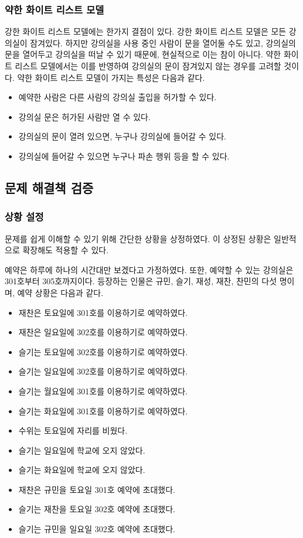\documentclass[11pt,a4paper]{article}
\begin{document}
\subsubsection{약한 화이트 리스트 모델}
강한 화이트 리스트 모델에는 한가지 결점이 있다. 강한 화이트 리스트 모델은 모든
강의실이 잠겨있다. 하지만 강의실을 사용 중인 사람이 문을 열어둘 수도 있고,
강의실의 문을 열어두고 강의실을 떠날 수 있기 때문에, 현실적으로 이는 참이
아니다. 약한 화이트 리스트 모델에서는 이를 반영하여 강의실의 문이 잠겨있지 않는
경우를 고려할 것이다. 약한 화이트 리스트 모델이 가지는 특성은 다음과 같다.
\begin{itemize}
\item 예약한 사람은 다른 사람의 강의실 출입을 허가할 수 있다.
\item 강의실 문은 허가된 사람만 열 수 있다.
\item 강의실의 문이 열려 있으면, 누구나 강의실에 들어갈 수 있다.
\item 강의실에 들어갈 수 있으면 누구나 파손 행위 등을 할 수 있다.
\end{itemize}

\subsection{문제 해결책 검증}

\subsubsection{상황 설정}
문제를 쉽게 이해할 수 있기 위해 간단한 상황을 상정하였다. 이 상정된 상황은
일반적으로 확장해도 적용할 수 있다.

예약은 하루에 하나의 시간대만 보겠다고 가정하였다. 또한, 예약할 수 있는
강의실은 301호부터 305호까지이다. 등장하는 인물은 규민, 슬기, 재성, 재찬,
찬민의 다섯 명이며, 예약 상황은 다음과 같다.

\begin{itemize}
\item 재찬은 토요일에 301호를 이용하기로 예약하였다.
\item 재찬은 일요일에 302호를 이용하기로 예약하였다.
\item 슬기는 토요일에 302호를 이용하기로 예약하였다.
\item 슬기는 일요일에 302호를 이용하기로 예약하였다.
\item 슬기는 월요일에 301호를 이용하기로 예약하였다.
\item 슬기는 화요일에 301호를 이용하기로 예약하였다.
\item 수위는 토요일에 자리를 비웠다.
\item 슬기는 일요일에 학교에 오지 않았다.
\item 슬기는 화요일에 학교에 오지 않았다.
\item 재찬은 규민을 토요일 301호 예약에 초대했다.
\item 슬기는 재찬을 토요일 302호 예약에 초대했다.
\item 슬기는 규민을 일요일 302호 예약에 초대했다.
\end{itemize}
\end{document}
